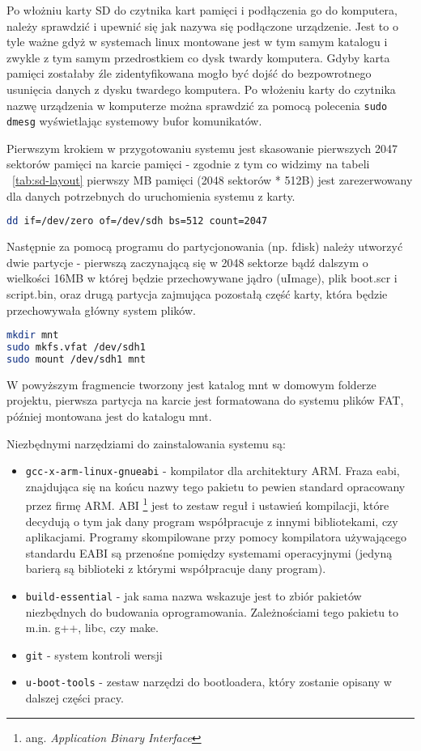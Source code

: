\par
Po włożniu karty SD do czytnika kart pamięci i podłączenia go do komputera, należy sprawdzić i upewnić się jak nazywa się podłączone urządzenie. Jest to o tyle ważne gdyż w systemach linux montowane jest w tym samym katalogu i zwykle z tym samym przedrostkiem co dysk twardy komputera. Gdyby karta pamięci zostałaby źle zidentyfikowana mogło być dojść do bezpowrotnego usunięcia danych z dysku twardego komputera. Po włożeniu karty do czytnika nazwę urządzenia w komputerze można sprawdzić za pomocą polecenia \lstinline{sudo dmesg} wyświetlając systemowy bufor komunikatów. 
\par
Pierwszym krokiem w przygotowaniu systemu jest skasowanie pierwszych 2047 sektorów pamięci na karcie pamięci - zgodnie z tym co widzimy na tabeli ~\ref{tab:sd-layout} pierwszy MB pamięci (2048 sektorów * 512B) jest zarezerwowany dla danych potrzebnych do uruchomienia systemu z karty.
\par
\begin{lstlisting}[language=bash]
dd if=/dev/zero of=/dev/sdh bs=512 count=2047
\end{lstlisting}
\par
Następnie za pomocą programu do partycjonowania (np. fdisk) należy utworzyć dwie partycje - pierwszą zaczynającą się w 2048 sektorze bądź dalszym o wielkości 16MB w której będzie przechowywane jądro (uImage), plik boot.scr i script.bin, oraz drugą partycja zajmująca pozostałą część karty, która będzie przechowywała główny system plików.
\par

\begin{lstlisting}[language=bash]
mkdir mnt
sudo mkfs.vfat /dev/sdh1
sudo mount /dev/sdh1 mnt
\end{lstlisting}

W powyższym fragmencie tworzony jest katalog mnt w domowym folderze projektu, pierwsza partycja na karcie jest formatowana do systemu plików FAT, później montowana jest do katalogu mnt.


Niezbędnymi narzędziami do zainstalowania systemu są:
\begin{itemize}
	\item {\lstinline{gcc-x-arm-linux-gnueabi}}  - kompilator dla architektury ARM. Fraza eabi, znajdująca się na końcu nazwy tego pakietu to pewien standard opracowany przez firmę ARM. ABI  \footnote{ang. \emph{Application Binary Interface}} jest to zestaw reguł i ustawień kompilacji, które decydują o tym jak dany program współpracuje z innymi bibliotekami, czy aplikacjami. Programy skompilowane przy pomocy kompilatora używającego standardu EABI są przenośne pomiędzy systemami operacyjnymi (jedyną barierą są biblioteki z którymi współpracuje dany program).
	\item {\lstinline{build-essential}} - jak sama nazwa wskazuje jest to zbiór pakietów niezbędnych do budowania oprogramowania. Zależnościami tego pakietu to m.in. g++, libc, czy make.
	\item {\lstinline{git}} - system kontroli wersji
	\item {\lstinline{u-boot-tools}} - zestaw narzędzi do bootloadera, który zostanie opisany w dalszej części pracy.
\end{itemize}


